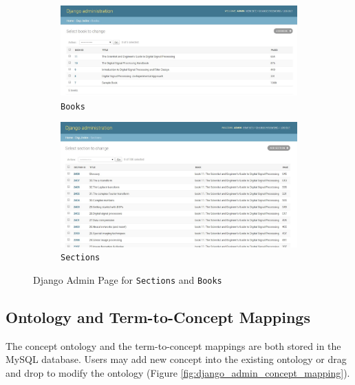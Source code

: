 \begin{figure}[!htbp]
\centering
 
  \begin{subfigure}{\textwidth}
  \centering
  \includegraphics[width=\linewidth]{system_demonstration/demo_admin_books.jpg}
  \caption{\texttt{Books}}
  \label{fig:sfig:admin_books}
  \end{subfigure}
  
  \begin{subfigure}{\textwidth}
  \centering
  \includegraphics[width=\linewidth]{system_demonstration/demo_admin_sections.jpg}
  \caption{\texttt{Sections}}
  \label{fig:sfig:admin_sections}
  \end{subfigure}
 
\caption{Django Admin Page for \texttt{Sections} and \texttt{Books}}
\label{fig:django_admin_section_book}
\end{figure}

\subsection{Ontology and Term-to-Concept Mappings}
The concept ontology and the term-to-concept mappings are both stored in the MySQL database. Users may add new concept into the existing ontology or drag and drop to modify the ontology (Figure \ref{fig:django_admin_concept_mapping}).

